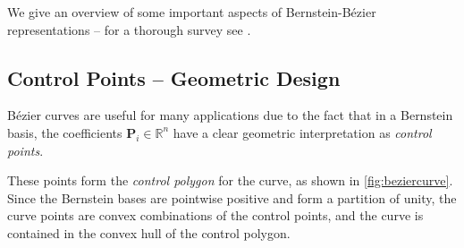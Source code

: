 \documentclass[12pt,final,3p]{elsarticle}
\begin{document}
We give an overview of some important aspects of Bernstein-B\'{e}zier representations -- for a thorough survey see \cite{farouki2012bernstein}.
\subsection{Control Points -- Geometric Design}\label{sec:motivation:bezier}
B\'{e}zier curves are useful for many applications due to the fact that in a Bernstein basis, the coefficients $\mathbf{P}_{i} \in \mathbb{R}^{n}$ have a clear geometric interpretation as \emph{control points}. 

These points form the \emph{control polygon} for the curve, as shown in \autoref{fig:beziercurve}. Since the Bernstein bases are pointwise positive and form a partition of unity, the curve points are convex combinations of the control points, and the curve is contained in the convex hull of the control polygon.
\end{document}
